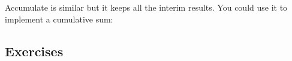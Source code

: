 \documentclass[]{book}
\newenvironment{Shaded}{\begin{snugshade}}{\end{snugshade}}
\newcommand{\KeywordTok}[1]{\textcolor[rgb]{0.13,0.29,0.53}{\textbf{{#1}}}}
\newcommand{\DataTypeTok}[1]{\textcolor[rgb]{0.13,0.29,0.53}{{#1}}}
\newcommand{\DecValTok}[1]{\textcolor[rgb]{0.00,0.00,0.81}{{#1}}}
\newcommand{\StringTok}[1]{\textcolor[rgb]{0.31,0.60,0.02}{{#1}}}
\newcommand{\CommentTok}[1]{\textcolor[rgb]{0.56,0.35,0.01}{\textit{{#1}}}}
\newcommand{\NormalTok}[1]{{#1}}
\begin{document}
Accumulate is similar but it keeps all the interim results. You could
use it to implement a cumulative sum:

\begin{Shaded}
\end{Shaded}

\subsection{Exercises}\label{exercises-59}
\end{document}
